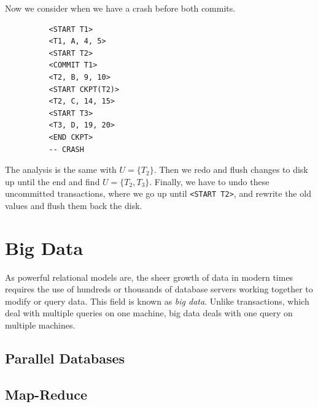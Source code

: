 \documentclass{article}
\begin{document}
      \begin{example}
        Now we consider when we have a crash before both commits. 
        \begin{lstlisting}
          <START T1>
          <T1, A, 4, 5>
          <START T2>
          <COMMIT T1>
          <T2, B, 9, 10>
          <START CKPT(T2)>
          <T2, C, 14, 15>
          <START T3>
          <T3, D, 19, 20>
          <END CKPT>
          -- CRASH
        \end{lstlisting} 
        The analysis is the same with $U = \{T_2\}$. Then we redo and flush changes to disk up until the end and find $U = \{T_2, T_3\}$. Finally, we have to undo these uncommitted transactions, where we go up until \texttt{<START T2>}, and rewrite the old values and flush them back the disk. 
      \end{example}

\section{Big Data} 

  As powerful relational models are, the sheer growth of data in modern times requires the use of hundreds or thousands of database servers working together to modify or query data. This field is known as \textit{big data}. Unlike transactions, which deal with multiple queries on one machine, big data deals with one query on multiple machines. 

  \subsection{Parallel Databases} 

  \subsection{Map-Reduce}
\end{document}
